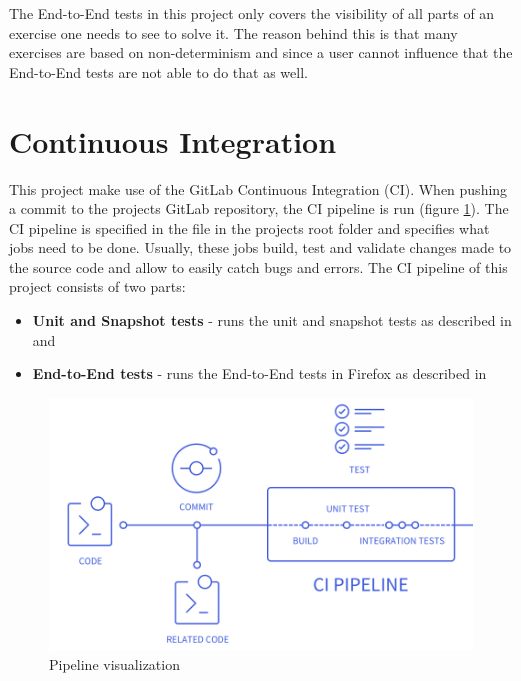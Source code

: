 The End-to-End tests in this project only covers the visibility of all parts of an exercise one needs to see to solve it. The reason behind this is that many exercises are based on non-determinism and since a user cannot influence that the End-to-End tests are not able to do that as well.

\section{Continuous Integration}
\label{section:CI}

This project make use of the GitLab Continuous Integration (CI). When pushing a commit to the projects GitLab repository, the CI pipeline is run (figure \ref{fig:pipeline}). The CI pipeline is specified in the  file in the projects root folder and specifies what jobs need to be done. Usually, these jobs build, test and validate changes made to the source code and allow to easily catch bugs and errors.
The CI pipeline of this project consists of two parts:

\begin{itemize}
    \item \textbf{Unit and Snapshot tests} - runs the unit and snapshot tests as described in  and 
    \item \textbf{End-to-End tests} - runs the End-to-End tests in Firefox as described in 
\end{itemize}

\begin{figure} 
    \centering
    \includegraphics[width=0.6 \columnwidth]{figures/pipeline.png}
    \caption{Pipeline visualization \cite{CIPipeline}} 
    \label{fig:pipeline} 
\end{figure}